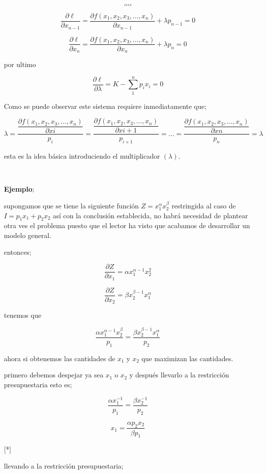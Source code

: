 \documentclass[12pt]{article}
\begin{document}
{$$....$$
$$....$$

$$\dfrac{\partial \ell }{\partial x_{n-1}} = \dfrac{\partial f(x_1,x_2,x_3,...,x_n)}{\partial x_{n-1}}+\lambda p_{n-1}= 0$$

$$\dfrac{\partial \ell }{\partial x_{n}} = \dfrac{\partial f(x_1,x_2,x_3,...,x_n)}{\partial x_{n}}+\lambda p_{n}= 0$$

por ultimo 

$$\dfrac{\partial \ell}{\partial \lambda} = K-\sum_{1}^{n} p_{i}x_{i} = 0$$




Como se puede observar este sistema requiere inmediatamente que; 

$$ \lambda = \dfrac{\dfrac{\partial f(x_1,x_2,x_3,...,x_n)}{\partial x{i}}}{p_{i}} =  \dfrac{\dfrac{\partial f(x_1,x_2,x_3,...,x_n)}{\partial x{i+1}}}{p_{i+1}} = ... = \dfrac{\dfrac{\partial f(x_1,x_2,x_3,...,x_n)}{\partial x{n}}}{p_{n}}= \lambda $$

esta es la idea básica introduciendo el multiplicador $(\lambda)$.

\
\

\textbf{Ejemplo}; 

supongamos que se tiene la siguiente función $ Z=x_{1}^{\alpha}x_{2}^{\beta}$ restringida al caso de $I=p_{1}x_{1}+p_{2}x_{2}$ así con la conclusión establecida, no habrá necesidad de plantear otra ves el problema puesto que el lector ha visto que acabamos de desarrollar un modelo general.

entonces; 

$$\dfrac{\partial Z}{\partial x_{1}}=\alpha x_{1}^{\alpha -1} x_{2}^{2}$$

$$\dfrac{\partial Z}{\partial x_{2}}=\beta x_{2}^{\beta -1}x_{1}^{\alpha}$$


tenemos que 

$$\dfrac{\alpha x_{1}^{\alpha -1} x_{2}^{\beta}}{p_{1}}=  \dfrac{\beta x_{2}^{\beta -1}x_{1}^{\alpha}}{p_{2}}$$

ahora si obtenemos las cantidades de $x_{1}$ y $x_{2}$ que maximizan las cantidades.

primero debemos despejar ya sea $x_{1}$ o $x_{2}$ y después llevarlo a la restricción presupuestaria esto es;


$$ \dfrac{ \alpha x_{1}^{-1}}{p_{1}} = \dfrac{\beta x_{2}^{-1}}{p_{2}}$$


$$x_{1}= \dfrac{\alpha p_{2} x_{2}}{\beta p_{1}}$$

[*]

llevando a la restricción presupuestaria;

}
\end{document}
